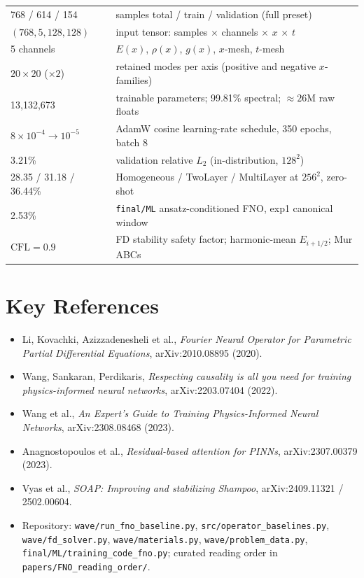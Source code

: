 \documentclass[11pt,a4paper]{article}
\begin{document}
\begin{center}
\begin{tabular}{@{}lp{8.6cm}@{}}
\toprule
768 / 614 / 154 & samples total / train / validation (full preset) \\
$(768,5,128,128)$ & input tensor: samples $\times$ channels $\times$ $x$ $\times$ $t$ \\
5 channels & $E(x)$, $\rho(x)$, $g(x)$, $x$-mesh, $t$-mesh \\
$20 \times 20$ ($\times 2$) & retained modes per axis (positive and negative $x$-families) \\
13{,}132{,}673 & trainable parameters; 99.81\% spectral; $\approx 26$M raw floats \\
$8\!\times\!10^{-4} \to 10^{-5}$ & AdamW cosine learning-rate schedule, 350 epochs, batch 8 \\
3.21\% & validation relative $L_2$ (in-distribution, $128^2$) \\
28.35 / 31.18 / 36.44\% & Homogeneous / TwoLayer / MultiLayer at $256^2$, zero-shot \\
2.53\% & \texttt{final/ML} ansatz-conditioned FNO, exp1 canonical window \\
$\mathrm{CFL} = 0.9$ & FD stability safety factor; harmonic-mean $E_{i+1/2}$; Mur ABCs \\
\bottomrule
\end{tabular}
\end{center}

\section*{Key References}
\begin{itemize}[nosep]
  \item Li, Kovachki, Azizzadenesheli et al., \emph{Fourier Neural Operator for
        Parametric Partial Differential Equations}, arXiv:2010.08895 (2020).
  \item Wang, Sankaran, Perdikaris, \emph{Respecting causality is all you need
        for training physics-informed neural networks}, arXiv:2203.07404 (2022).
  \item Wang et al., \emph{An Expert's Guide to Training Physics-Informed
        Neural Networks}, arXiv:2308.08468 (2023).
  \item Anagnostopoulos et al., \emph{Residual-based attention for PINNs},
        arXiv:2307.00379 (2023).
  \item Vyas et al., \emph{SOAP: Improving and stabilizing Shampoo},
        arXiv:2409.11321 / 2502.00604.
  \item Repository: \texttt{wave/run\_fno\_baseline.py},
        \texttt{src/operator\_baselines.py}, \texttt{wave/fd\_solver.py},
        \texttt{wave/materials.py}, \texttt{wave/problem\_data.py},
        \texttt{final/ML/training\_code\_fno.py}; curated reading order in
        \texttt{papers/FNO\_reading\_order/}.
\end{itemize}
\end{document}
